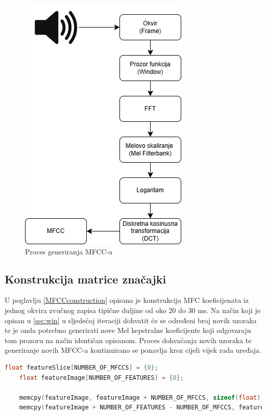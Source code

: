 \begin{figure}[htb]
    \centering
    \includegraphics[width=0.4\linewidth]{Chapters/struktura_sustava/generiranje_znacajki/generation.png} 
    \caption{Proces generiranja MFCC-a \cite{flowchart}}
    \label{pic:generation}
\end{figure}

\subsection{Konstrukcija matrice značajki}

U poglavlju \ref{MFCCconstruction} opisana je konstrukcija MFC koeficijenata iz jednog
okvira zvučnog zapisa tipične duljine od oko 20 do 30 ms. Na način koji je opisan u
\ref{sec:win} u sljedećoj iteraciji dohvatit će se određeni broj novih uzoraka te je onda
potrebno generirati nove Mel kepstralne koeficijente koji odgovaraju tom prozoru na način
identičan opisanom. Proces dohvaćanja novih uzoraka te generiranje novih MFCC-a kontinuirano
se ponavlja kroz cijeli vijek rada uređaja. 

\begin{lstlisting}[language=C++, caption=Matrica značajki, label=code:featureImage]
    float featureSlice[NUMBER_OF_MFCCS] = {0};
    float featureImage[NUMBER_OF_FEATURES] = {0};

    memcpy(featureImage, featureImage + NUMBER_OF_MFCCS, sizeof(float) * (NUMBER_OF_FEATURES - NUMBER_OF_MFCCS));
    memcpy(featureImage + NUMBER_OF_FEATURES - NUMBER_OF_MFCCS, featureSlice, sizeof(float) * NUMBER_OF_MFCCS);
\end{lstlisting}